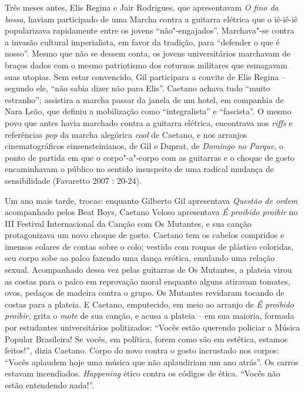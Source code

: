Três meses antes, Elis Regina e Jair Rodrigues, que apresentavam \emph{O
fino da bossa}, haviam participado de uma Marcha contra a guitarra
elétrica que o iê-iê-iê popularizava rapidamente entre os jovens
``não"-engajados''. Marchava"-se contra a invasão cultural imperialista,
em favor da tradição, para ``defender o que é nosso''. Mesmo que não se
dessem conta, os jovens universitários marchavam de braços dados com o
mesmo patriotismo dos coturnos militares que esmagavam suas utopias. Sem
estar convencido, Gil participara a convite de Elis Regina -- segundo
ele, ``não sabia dizer não para Elis''. Caetano achava tudo ``muito
estranho''; assistira a marcha passar da janela de um hotel, em
companhia de Nara Leão, que definiu a mobilização como ``integralista''
e ``fascista''. O mesmo povo que antes havia marchado contra a guitarra
elétrica, encontrava nos \emph{riffs }e referências \emph{pop} da marcha
alegórica \emph{cool }de Caetano, e nos arranjos cinematográficos
einsensteinianos, de Gil e Duprat, de \emph{Domingo no Parque}, o
ponto de partida em que o corpo"-a"-corpo com as guitarras e o choque de
gosto encaminhavam o público no sentido insuspeito de uma radical
mudança de sensibilidade (Favaretto 2007 : 20-24).

Um ano mais tarde, trocas: enquanto Gilberto Gil apresentava
\emph{Questão de ordem }acompanhado pelos Beat Boys, Caetano\emph{
}Veloso apresentava \emph{É proibido proibir} no III Festival
Internacional da Canção com Os Mutantes, e sua canção protagonizava um
novo choque de gosto. Caetano tem os cabelos compridos e imensos colares
de contas sobre o colo; vestido com roupas de plástico coloridas, seu
corpo sobe ao palco fazendo uma dança erótica, emulando uma relação
sexual. Acompanhado dessa vez pelas guitarras de Os Mutantes, a plateia
virou as costas para o palco em reprovação moral enquanto alguns
atiravam tomates, ovos, pedaços de madeira contra o grupo. Os Mutantes
revidaram tocando de costas para a plateia. E Caetano, emputecido, em
meio ao arranjo de \emph{É proibido proibir}, grita o \emph{mote }de sua
canção, e acusa a plateia -- em sua maioria, formada por estudantes
universitários politizados: ``Vocês estão querendo policiar a Música
Popular Brasileira! Se vocês, em política, forem como são em estética,
estamos feitos!'', dizia Caetano. Corpo do novo contra o gosto
incrustado nos corpos: ``Vocês aplaudem hoje uma música que não
aplaudiriam um ano atrás''. Os carros estavam incendiados.
\emph{Happening }ético contra os códigos de ética. ``Vocês não estão
entendendo nada!''.

